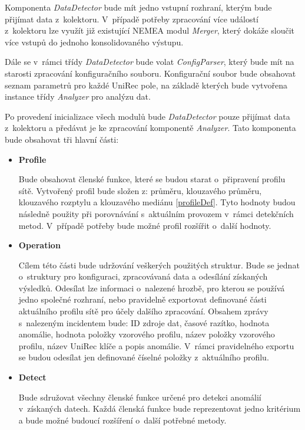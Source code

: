  Komponenta \textit{DataDetector} bude mít jedno vstupní rozhraní, kterým bude přijímat data z~kolektoru.
 V~případě potřeby
 zpracování více událostí z~kolektoru lze využít již existující NEMEA modul \textit{Merger}, který
 dokáže sloučit více vstupů do jednoho konsolidovaného výstupu. 
 
 Dále se v~rámci třídy \textit{DataDetector} bude volat \textit{ConfigParser}, který bude mít na starosti zpracování 
 konfiguračního souboru. Konfigurační soubor bude obsahovat seznam parametrů pro každé UniRec pole,
 na základě kterých bude vytvořena instance třídy \textit{Analyzer} pro analýzu dat. 
 
 Po provedení inicializace všech modulů bude \textit{DataDetector} pouze přijímat data z~kolektoru a 
 předávat je ke zpracování komponentě \textit{Analyzer}. Tato komponenta bude obsahovat
 tři hlavní části:
 \begin{itemize}
  \item \textbf{Profile}
  
  Bude obsahovat členské funkce, které se budou starat o~připravení profilu sítě. 
  Vytvořený profil bude složen z: průměru, klouzavého průměru, klouzavého
  rozptylu a klouzavého mediánu \ref{profileDef}.
  Tyto hodnoty budou následně použity při porovnávání s~aktuálním provozem v~rámci detekčních
  metod. V~případě potřeby bude možné profil rozšířit o~další hodnoty.
  
   \item \textbf{Operation}
  
  Cílem této části bude udržování veškerých použitých struktur. Bude se jednat o~struktury 
  pro konfiguraci, zpracovávaná data a odesílání získaných výsledků. Odesílat lze informaci
o~nalezené hrozbě, pro kterou se používá jedno společné rozhraní, nebo pravidelně exportovat
  definované části aktuálního profilu sítě pro účely dalšího zpracování. Obsahem zprávy s~nalezeným
  incidentem bude: ID zdroje dat, časové razítko, hodnota anomálie, hodnota položky vzorového profilu, 
  název položky vzorového profilu, název UniRec klíče a popis anomálie. V~rámci pravidelného exportu
  se budou odesílat jen definované číselné položky z~aktuálního profilu.
  
  \item \textbf{Detect}
  
  Bude sdružovat všechny členské funkce určené pro detekci anomálií v~získaných datech. 
  Každá členská funkce bude reprezentovat jedno kritérium a bude možné budoucí rozšíření o~další
  potřebné metody.
  
 \end{itemize}

